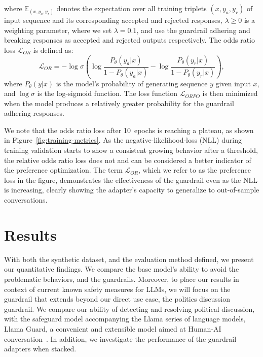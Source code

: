 \documentclass[letterpaper]{article}
\newcommand{\finetuningEpochsDefault}{10}
\newcommand{\oddsWeight}{0.1}
\begin{document}
where $\mathbb{E}_{(x,y_a,y_r)}$ denotes the expectation over all training triplets $(x,y_a,y_r)$ of input sequence and its corresponding accepted and rejected responses, $\lambda \ge 0$ is a weighting parameter, where we set $\lambda = \oddsWeight$, and use the guardrail adhering and breaking responses as accepted and rejected outputs respectively.  
The odds ratio loss $\mathcal{L}_{OR}$ is defined as:
\begin{equation}
	\mathcal{L}_{OR} = -\log \sigma \left(\log \frac{P_\theta(y_a|x)}{1 - P_\theta(y_a|x)} - \log \frac{P_\theta(y_r|x)}{1 - P_\theta(y_r|x)}\right),
\end{equation}
where $P_\theta(y|x)$ is the model's probability of generating sequence $y$ given input $x$, and $\log \sigma$ is the log-sigmoid function. The loss function $\mathcal{L}_{ORPO}$ is then minimized when the model produces a relatively greater probability for the guardrail adhering responses. 

We note that the odds ratio loss after \finetuningEpochsDefault~epochs is reaching a plateau, as shown in Figure~\ref{fig:training-metrics}. As the negative-likelihood-loss (NLL) during training validation starts to show a consistent growing behavior after a threshold, the relative odds ratio loss does not and can be considered a better indicator of the preference optimization.  
The term $\mathcal{L}_{OR}$, which we refer to as the preference loss in the figure, demonstrates the effectiveness of the guardrail even as the NLL is increasing, clearly showing the adapter's capacity to generalize to out-of-sample conversations.

\section{Results}
With both the synthetic dataset, and the evaluation method defined, we present our quantitative findings. We compare the base model's ability to avoid the problematic behaviors, and the guardrails. Moreover, to place our results in context of current known safety measures for LLMs, we will focus on the guardrail that extends beyond our direct use case, the politics discussion guardrail. We compare our ability of detecting and resolving political discussion, with the safeguard model accompanying the Llama series of language models, Llama Guard, a convenient and extensible model aimed at Human-AI conversation~\cite{inan2023llama}. In addition, we investigate the performance of the guardrail adapters when stacked.
\end{document}
